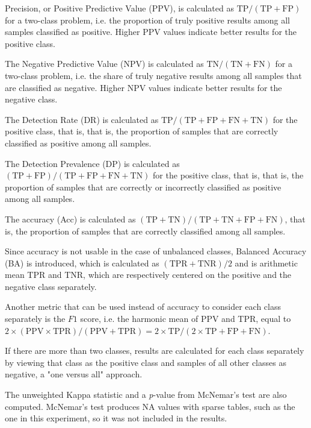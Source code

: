 \documentclass[sn-mathphys-num]{sn-jnl}%
\begin{document}
Precision, or Positive Predictive Value (PPV), is calculated as $\mathrm{TP}/(\mathrm{TP}+\mathrm{FP})$ for a two-class problem, i.e. the proportion of truly positive results among all samples classified as positive. Higher PPV values indicate better results for the positive class.

The Negative Predictive Value (NPV) is calculated as $\mathrm{TN}/(\mathrm{TN}+\mathrm{FN})$ for a two-class problem, i.e. the share of truly negative results among all samples that are classified as negative. Higher NPV values indicate better results for the negative class.

The Detection Rate (DR) is calculated as $\mathrm{TP}/(\mathrm{TP}+\mathrm{FP}+\mathrm{FN}+\mathrm{TN})$ for the positive class, that is, that is, the proportion of samples that are correctly classified as positive among all samples.

The Detection Prevalence (DP) is calculated as $(\mathrm{TP}+\mathrm{FP})/(\mathrm{TP}+\mathrm{FP}+\mathrm{FN}+\mathrm{TN})$ for the positive class, that is, that is, the proportion of samples that are correctly or incorrectly classified as positive among all samples.

The accuracy (Acc) is calculated as $(\mathrm{TP} + \mathrm{TN}) / (\mathrm{TP} + \mathrm{TN} + \mathrm{FP} + \mathrm{FN})$, that is, the proportion of samples that are correctly classified among all samples.

Since accuracy is not usable in the case of unbalanced classes, Balanced Accuracy (BA) is introduced, which is calculated as $(\mathrm{TPR} + \mathrm{TNR}) / 2$ and is arithmetic mean TPR and TNR, which are respectively centered on the positive and the negative class separately.

Another metric that can be used instead of accuracy to consider each class separately is the $F1$ score, i.e. the harmonic mean of PPV and TPR, equal to $2 \times (\mathrm{PPV} \times \mathrm{TPR}) / (\mathrm{PPV} + \mathrm{TPR}) = 2 \times \mathrm{TP} / (2 \times \mathrm{TP} + \mathrm{FP} + \mathrm{FN})$.

If there are more than two classes, results are calculated for each class separately by viewing that class as the positive class and samples of all other classes as negative, a "one versus all" approach.

The unweighted Kappa statistic and a \textit{p}-value from McNemar's test are also computed. McNemar's test produces NA values with sparse tables, such as the one in this experiment, so it was not included in the results.
\end{document}
